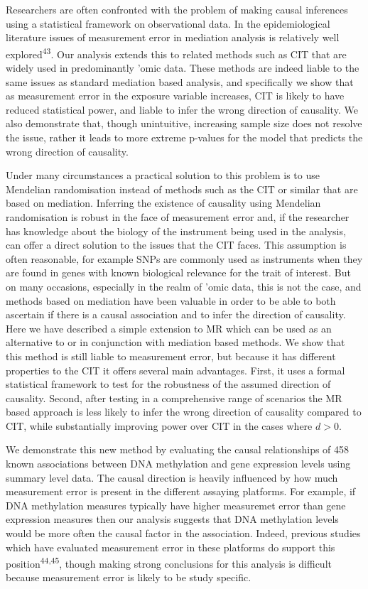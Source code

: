 \documentclass[]{article}
\begin{document}
Researchers are often confronted with the problem of making causal
inferences using a statistical framework on observational data. In the
epidemiological literature issues of measurement error in mediation
analysis is relatively well explored\textsuperscript{43}. Our analysis
extends this to related methods such as CIT that are widely used in
predominantly 'omic data. These methods are indeed liable to the same
issues as standard mediation based analysis, and specifically we show
that as measurement error in the exposure variable increases, CIT is
likely to have reduced statistical power, and liable to infer the wrong
direction of causality. We also demonstrate that, though unintuitive,
increasing sample size does not resolve the issue, rather it leads to
more extreme p-values for the model that predicts the wrong direction of
causality.

Under many circumstances a practical solution to this problem is to use
Mendelian randomisation instead of methods such as the CIT or similar
that are based on mediation. Inferring the existence of causality using
Mendelian randomisation is robust in the face of measurement error and,
if the researcher has knowledge about the biology of the instrument
being used in the analysis, can offer a direct solution to the issues
that the CIT faces. This assumption is often reasonable, for example
SNPs are commonly used as instruments when they are found in genes with
known biological relevance for the trait of interest. But on many
occasions, especially in the realm of 'omic data, this is not the case,
and methods based on mediation have been valuable in order to be able to
both ascertain if there is a causal association and to infer the
direction of causality. Here we have described a simple extension to MR
which can be used as an alternative to or in conjunction with mediation
based methods. We show that this method is still liable to measurement
error, but because it has different properties to the CIT it offers
several main advantages. First, it uses a formal statistical framework
to test for the robustness of the assumed direction of causality.
Second, after testing in a comprehensive range of scenarios the MR based
approach is less likely to infer the wrong direction of causality
compared to CIT, while substantially improving power over CIT in the
cases where \(d > 0\).

We demonstrate this new method by evaluating the causal relationships of
458 known associations between DNA methylation and gene expression
levels using summary level data. The causal direction is heavily
influenced by how much measurement error is present in the different
assaying platforms. For example, if DNA methylation measures typically
have higher measuremet error than gene expression measures then our
analysis suggests that DNA methylation levels would be more often the
causal factor in the association. Indeed, previous studies which have
evaluated measurement error in these platforms do support this
position\textsuperscript{44,45}, though making strong conclusions for
this analysis is difficult because measurement error is likely to be
study specific.
\end{document}

